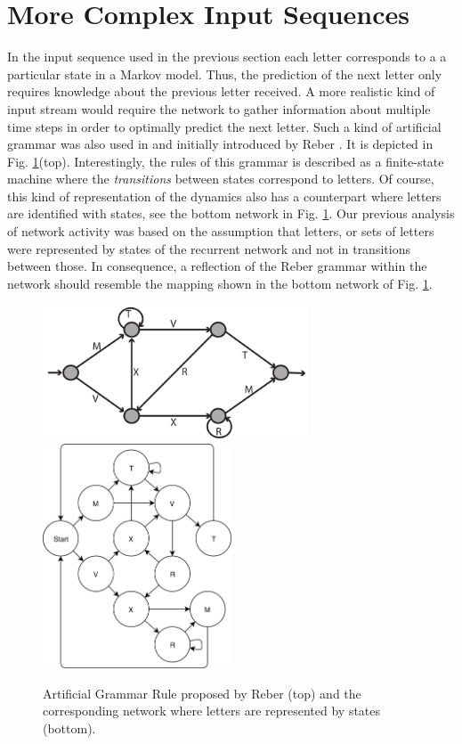 \documentclass[10pt,a4paper]{article}
\begin{document}
\section{More Complex Input Sequences}
In the input sequence used in the previous section each letter corresponds to a a particular state in a Markov model. Thus, the prediction of the next letter only requires knowledge about the previous letter received. A more realistic kind of input stream would require the network to gather information about multiple time steps in order to optimally predict the next letter. Such a kind of artificial grammar was also used in \citep{Duarte_2014} and initially introduced by Reber \cite{Reber_1967}. It is depicted in Fig. \ref{fig:Reber_Grammar}(top). Interestingly, the rules of this grammar is described as a finite-state machine where the \textit{transitions} between states correspond to letters. Of course, this kind of representation of the dynamics also has a counterpart where letters are identified with states, see the bottom network in Fig. \ref{fig:Reber_Grammar}. Our previous analysis of network activity was based on the assumption that letters, or sets of letters were represented by states of the recurrent network and not in transitions between those. In consequence, a reflection of the Reber grammar within the network should resemble the mapping shown in the bottom network of Fig. \ref{fig:Reber_Grammar}. 
\begin{figure}
\includegraphics[width=0.7\textwidth]{../plots/artif_grammar_illustration.png}
\includegraphics[width=0.5\textwidth]{../plots/Reber_Grammar_States.png}
\caption{Artificial Grammar Rule proposed by Reber \citep{Reber_1967} (top) and the corresponding network where letters are represented by states (bottom).}
\label{fig:Reber_Grammar}
\end{figure}


\newpage


\end{document}
